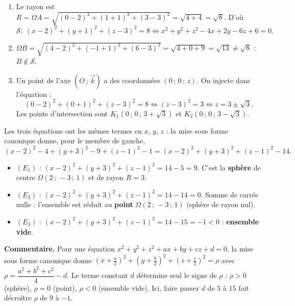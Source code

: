 \documentclass[11pt]{article}
\begin{document}
\begin{corrige}
\begin{enumerate}
\item Le rayon est $R=\Omega A=\sqrt{(0-2)^2+(1+1)^2+(3-3)^2}=\sqrt{4+4}=\sqrt{8}$. D'où
\[\mathcal{S}:\ (x-2)^2+(y+1)^2+(z-3)^2=8 \iff x^2+y^2+z^2-4x+2y-6z+6=0.\]
\item $\Omega B=\sqrt{(4-2)^2+(-1+1)^2+(6-3)^2}=\sqrt{4+0+9}=\sqrt{13}\neq\sqrt{8}$ : $B\notin\mathcal{S}$.
\item Un point de l'axe $(O\,;\,\vec{k})$ a des coordonnées $(0\,;\,0\,;\,z)$. On injecte dans l'équation :
\[(0-2)^2+(0+1)^2+(z-3)^2=8 \iff (z-3)^2=3 \iff z=3\pm\sqrt{3}.\]
Les points d'intersection sont $K_1(0\,;\,0\,;\,3+\sqrt{3})$ et $K_2(0\,;\,0\,;\,3-\sqrt{3})$.
\end{enumerate}
\end{corrige}

\begin{corrige}
Les trois équations ont les mêmes termes en $x$, $y$, $z$ : la mise sous forme canonique donne, pour le membre de gauche,
\[(x-2)^2-4+(y+3)^2-9+(z-1)^2-1 = (x-2)^2+(y+3)^2+(z-1)^2-14.\]
\begin{itemize}
\item $(E_1)$ : $(x-2)^2+(y+3)^2+(z-1)^2=14-5=9$. C'est la \textbf{sphère} de centre $\Omega(2\,;\,-3\,;\,1)$ et de rayon $R=3$.
\item $(E_2)$ : $(x-2)^2+(y+3)^2+(z-1)^2=14-14=0$. Somme de carrés nulle : l'ensemble est réduit au \textbf{point} $\Omega(2\,;\,-3\,;\,1)$ (sphère de rayon nul).
\item $(E_3)$ : $(x-2)^2+(y+3)^2+(z-1)^2=14-15=-1<0$ : \textbf{ensemble vide}.
\end{itemize}
\textbf{Commentaire.} Pour une équation $x^2+y^2+z^2+ax+by+cz+d=0$, la mise sous forme canonique donne $\left(x+\tfrac{a}{2}\right)^2+\left(y+\tfrac{b}{2}\right)^2+\left(z+\tfrac{c}{2}\right)^2=\rho$ avec $\rho=\dfrac{a^2+b^2+c^2}{4}-d$. Le terme constant $d$ détermine seul le signe de $\rho$ : $\rho>0$ (sphère), $\rho=0$ (point), $\rho<0$ (ensemble vide). Ici, faire passer $d$ de $5$ à $15$ fait décroître $\rho$ de $9$ à $-1$.
\end{corrige}
\end{document}
